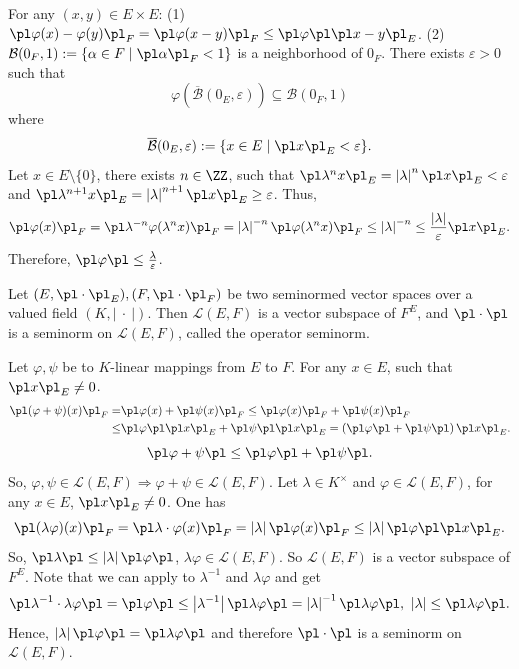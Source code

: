 \begin{proofenv}
    For any $(x,y)\in E\times E$:
    \newline
    (1) $\pl\varphi(x)-\varphi(y)\pl_{F}=\pl\varphi(x-y)\pl_{F}\le \pl\varphi\pl\pl x-y\pl_{E}$.
    \newline
    (2) $\mathcal{B}(0_F,1):=\{\alpha\in F\mid \pl\alpha\pl_{F}<1\}$ is a neighborhood of $0_F$. There exists $\varepsilon>0$ such that 
    $$\varphi(\overline{\mathcal{B}}(0_E,\varepsilon))\subseteq\mathcal{B}(0_F,1)$$
    where $$\overline{\mathcal{B}}(0_E,\varepsilon):=\{x \in E\mid \pl x\pl_E<\varepsilon\}.$$
    Let $x\in E\setminus \{0\}$, there exists $n\in \ZZ$, such that $\pl\lambda ^n x\pl_E=\left|\lambda\right|^n\pl x\pl_E<\varepsilon$ and $\pl \lambda^{n+1}x\pl_{E}=\left|\lambda\right|^{n+1}\pl x\pl_E\ge \varepsilon$. Thus,
    $$\pl \varphi(x)\pl_F=\pl \lambda^{-n}\varphi(\lambda^n x)\pl_{F}=\left|\lambda\right|^{-n}\pl \varphi(\lambda^n x)\pl_{F}\le \left|\lambda\right|^{-n}\le\frac{\left|\lambda\right|}{\varepsilon}\pl x\pl_E.$$
    Therefore, $\pl\varphi\pl\le \frac{\lambda}{\varepsilon}$.
\end{proofenv}
\begin{propositionenv}
    Let $(E,\pl\cdot\pl_E),(F,\pl\cdot\pl_F)$ be two seminormed vector spaces over a valued field $(K,\left|\ \cdot\ \right|)$. Then $\mathscr{L}(E,F)$ is a vector subspace of $F^E$, and $\pl\cdot\pl$ is a seminorm on $\mathscr{L}(E,F)$, called the operator seminorm.
\end{propositionenv}
\begin{proofenv}
    Let $\varphi,\psi$ be to $K$-linear mappings from $E$ to $F$. For any $x\in E$, such that $\pl x\pl_E\neq0$.
    \begin{align*}
        \pl(\varphi+\psi)(x)\pl_F=&\pl\varphi(x)+\pl\psi(x)\pl_F\le \pl\varphi(x)\pl_F+\pl\psi(x)\pl_F\\
        \le& \pl\varphi\pl\pl x\pl_E+\pl\psi\pl\pl x\pl_E=\left(\pl\varphi\pl+\pl\psi\pl\right)\pl x\pl_E.
    \end{align*}
    $$\pl\varphi+\psi\pl\le\pl\varphi\pl+\pl\psi\pl.$$
    So, $\varphi,\psi\in \mathscr{L}(E,F)\Rightarrow \varphi+\psi\in \mathscr{L}(E,F)$.
    Let $\lambda\in K^\times$ and $\varphi\in \mathscr{L}(E,F)$, for any $x\in E$, $\pl x\pl _E\neq0$. One has 
    $$\pl (\lambda\varphi)(x)\pl_{F}=\pl\lambda\cdot\varphi(x)\pl_F=\left|\lambda\right|\pl\varphi(x)\pl_F \le \left|\lambda\right|\pl\varphi\pl\pl x\pl_E.$$
    So, $\pl\lambda\pl\le\left|\lambda\right|\pl\varphi\pl$, $\lambda\varphi\in \mathscr{L}(E,F)$. So $\mathscr{L}(E,F)$ is a vector subspace of $F^E$. Note that we can apply to $\lambda^{-1}$ and $\lambda\varphi$ and get 
    $$\pl \lambda^{-1}\cdot\lambda\varphi\pl=\pl\varphi\pl\le \left|\lambda^{-1}\right|\pl\lambda\varphi\pl=\left|\lambda\right|^{-1}\pl\lambda\varphi\pl,\ \left|\lambda\right|\le\pl\lambda\varphi\pl.$$
    Hence, $\left|\lambda\right|\pl\varphi\pl=\pl\lambda\varphi\pl$ and therefore $\pl\cdot\pl$ is a seminorm on $\mathscr{L}(E,F)$.
\end{proofenv}
